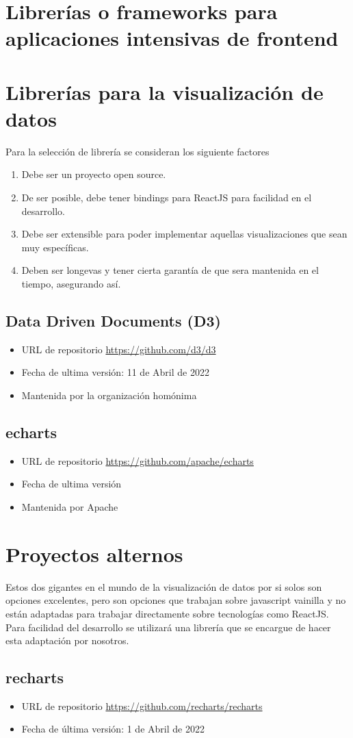 \section{Librerías o frameworks para aplicaciones intensivas de frontend}

\section{Librerías para la visualización de datos}
Para la selección de librería se consideran los siguiente factores

\begin{enumerate}
    \item {Debe ser un proyecto open source.}
    \item {De ser posible, debe tener bindings para ReactJS para facilidad en el desarrollo.}
    \item {Debe ser extensible para poder implementar aquellas visualizaciones que sean muy específicas.}
    \item {Deben ser longevas y tener cierta garantía de que sera mantenida en el tiempo, asegurando así.}
\end{enumerate}

\subsection{ Data Driven Documents (D3) }
\begin{itemize}
    \item URL de repositorio \href{https://github.com/d3/d3}{https://github.com/d3/d3}
    \item Fecha de ultima versión: 11 de Abril de 2022
    \item Mantenida por la organización homónima
\end{itemize}

\subsection{ echarts }
\begin{itemize}
    \item URL de repositorio \href{https://github.com/apache/echarts}{https://github.com/apache/echarts}
    \item Fecha de ultima versión
    \item Mantenida por Apache
\end{itemize}

\section{ Proyectos alternos }
Estos dos gigantes en el mundo de la visualización de datos por si solos son opciones excelentes,
pero son opciones que trabajan sobre javascript vainilla y no están adaptadas para trabajar directamente sobre tecnologías como ReactJS.
Para facilidad del desarrollo se utilizará una librería que se encargue de hacer esta adaptación por nosotros.

\subsection{ recharts }
\begin{itemize}
    \item URL de repositorio \href{https://github.com/recharts/recharts}{https://github.com/recharts/recharts}
    \item Fecha de última versión: 1 de Abril de 2022
\end{itemize}